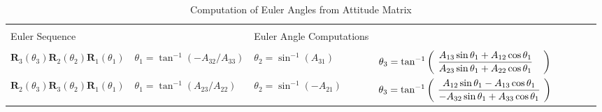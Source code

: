 \begin{landscape}
\begin{table}[h]
        \centering
        \vspace{0 pt}
        \caption{ Computation of Euler Angles from Attitude Matrix}
        \begin{tabular}{llllllll}  \hline \hline \\
        Euler Sequence \hspace{0.5 in} & $ $ & Euler Angle Computations \hspace{-1.1 in} & $ $ \\
        \hline \\
        \footnotesize
        $\mathbf{R}_3(\theta_3)\mathbf{R}_2(\theta_2)\mathbf{R}_1(\theta_1)$
        \hspace{.1 in}
        &
        \footnotesize
        $\theta_1 =  \tan^{-1}(-A_{32}/A_{33})$
        &
        \footnotesize
        $\theta_2 =  \sin^{-1}(A_{31})$
        &
        \footnotesize
        $\theta_3  = \tan^{-1}\left(\hspace{0.05 in}\displaystyle\frac{A_{13}\sin{\theta_1}+
        A_{12}\cos{\theta_1}}{A_{23}\sin{\theta_1}+A_{22}\cos{\theta_1}}\hspace{0.15 in}\right ) \vspace{.1 in}$\\
        \footnotesize
        $\mathbf{R}_2(\theta_3)\mathbf{R}_3(\theta_2)\mathbf{R}_1(\theta_1)$ \hspace{.1 in}
        &
        \footnotesize
        $\theta_1 =  \tan^{-1}(A_{23}/A_{22})$
        &
        \footnotesize
        $\theta_2 =  \sin^{-1}(-A_{21})$
        &
        \footnotesize
        $\theta_3  = \tan^{-1}\left(\hspace{0.05 in}\displaystyle\frac{A_{12}\sin{\theta_1}- A_{13}\cos{\theta_1}}{-A_{32}\sin{\theta_1}+
        A_{33}\cos{\theta_1}}\hspace{0.05 in}\right) \vspace{.1 in}$\\

\end{tabular}
\end{table}
\end{landscape}
